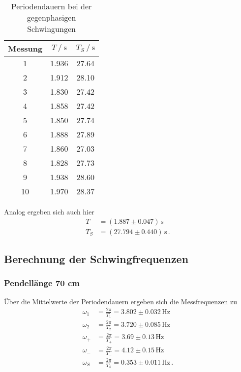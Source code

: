 \begin{table}[H]
  \centering
  \caption{Periodendauern bei der gegenphasigen Schwingungen}
  \label{tab:gekoppelteSchwingung2}
  \begin{tabular}{S[table-format=2.0] S S[table-format=2.2]}
    \toprule
    {Messung} & {$T \mathbin{/} \unit{\second}$} & {$T_S \mathbin{/} \unit{\second}$} \\
     & 1.936 & 27.64 \\
    2 & 1.912 & 28.10 \\
    3 & 1.830 & 27.42 \\
    4 & 1.858 & 27.42 \\
    5 & 1.850 & 27.74 \\
    6 & 1.888 & 27.89 \\
    7 & 1.860 & 27.03 \\
    8 & 1.828 & 27.73 \\
    9 & 1.938 & 28.60 \\
   10 & 1.970 & 28.37 \\
   \bottomrule
  \end{tabular}
\end{table}
Analog ergeben sich auch hier
\begin{align*}
  T  &= (1.887  \pm 0.047) \, \unit{\second}\\
 T_S &= (27.794 \pm 0.440) \, \unit{\second} \, .
\end{align*}



\subsection{Berechnung der Schwingfrequenzen}

\subsubsection{Pendellänge 70 cm} \label{sec:Schwingf1}

Über die Mittelwerte der Periodendauern ergeben sich die Messfrequenzen zu
\begin{align*}
\omega_1 & = \frac{2π}{T_1}   = 3.802 \pm 0.032     \,\unit{\hertz}\\
\omega_2 & = \frac{2π}{T_2}  = 3.720 \pm 0.085      \,\unit{\hertz}\\
\omega_+ & = \frac{2π}{T_+}  = 3.69 \pm 0.13        \,\unit{\hertz}\\
\omega_- & = \frac{2π}{T_-}  = 4.12 \pm 0.15        \,\unit{\hertz}\\
\omega_S & = \frac{2π}{T_S} = 0.353 \pm 0.011       \,\unit{\hertz}\,.
\end{align*} 

